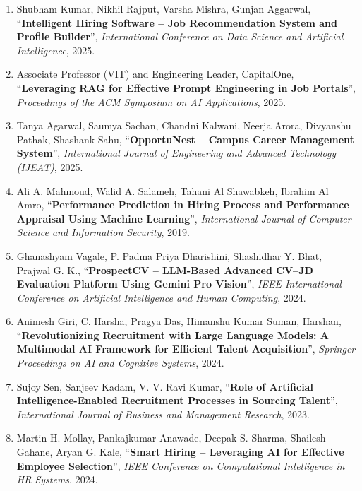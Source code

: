 \documentclass[a4paper, 12pt]{report}
\begin{document}
\begin{center}
\begin{enumerate}
    \item Shubham Kumar, Nikhil Rajput, Varsha Mishra, Gunjan Aggarwal,  
    “\textbf{Intelligent Hiring Software – Job Recommendation System and Profile Builder}”,  
    \textit{International Conference on Data Science and Artificial Intelligence},  
    2025.

    \item Associate Professor (VIT) and Engineering Leader, CapitalOne,  
    “\textbf{Leveraging RAG for Effective Prompt Engineering in Job Portals}”,  
    \textit{Proceedings of the ACM Symposium on AI Applications},  
    2025.

    \item Tanya Agarwal, Saumya Sachan, Chandni Kalwani, Neerja Arora, Divyanshu Pathak, Shashank Sahu,  
    “\textbf{OpportuNest – Campus Career Management System}”,  
    \textit{International Journal of Engineering and Advanced Technology (IJEAT)},  
    2025.

    \item Ali A. Mahmoud, Walid A. Salameh, Tahani Al Shawabkeh, Ibrahim Al Amro,  
    “\textbf{Performance Prediction in Hiring Process and Performance Appraisal Using Machine Learning}”,  
    \textit{International Journal of Computer Science and Information Security},  
    2019.

    \item Ghanashyam Vagale, P. Padma Priya Dharishini, Shashidhar Y. Bhat, Prajwal G. K.,  
    “\textbf{ProspectCV – LLM-Based Advanced CV–JD Evaluation Platform Using Gemini Pro Vision}”,  
    \textit{IEEE International Conference on Artificial Intelligence and Human Computing},  
    2024.

    \item Animesh Giri, C. Harsha, Pragya Das, Himanshu Kumar Suman, Harshan,  
    “\textbf{Revolutionizing Recruitment with Large Language Models: A Multimodal AI Framework for Efficient Talent Acquisition}”,  
    \textit{Springer Proceedings on AI and Cognitive Systems},  
    2024.

    \item Sujoy Sen, Sanjeev Kadam, V. V. Ravi Kumar,  
    “\textbf{Role of Artificial Intelligence-Enabled Recruitment Processes in Sourcing Talent}”,  
    \textit{International Journal of Business and Management Research},  
    2023.

    \item Martin H. Mollay, Pankajkumar Anawade, Deepak S. Sharma, Shailesh Gahane, Aryan G. Kale,  
    “\textbf{Smart Hiring – Leveraging AI for Effective Employee Selection}”,  
    \textit{IEEE Conference on Computational Intelligence in HR Systems},  
    2024.
    \end{enumerate}
    \end{center}
\end{document}
